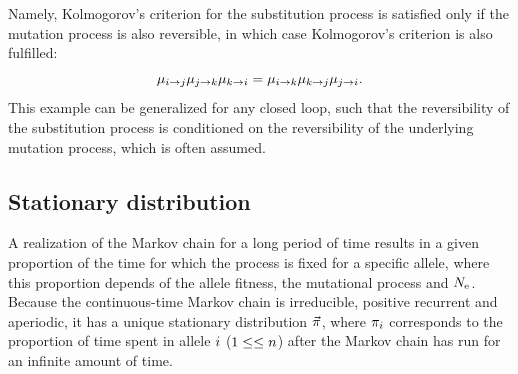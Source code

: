 Namely, Kolmogorov's criterion for the \gls{substitution} process is satisfied only if the mutation process is also reversible, in which case Kolmogorov's criterion is also fulfilled:
\begin{equation}
    \mu_{{i} \to {j}}\mu_{{j} \to {k}}\mu_{{k} \to {i}}=\mu_{{i} \to {k}}\mu_{{k} \to {j}}\mu_{{j} \to {i}}.
\end{equation}
This example can be generalized for any closed loop, such that the reversibility of the \gls{substitution} process is conditioned on the reversibility of the underlying mutation process, which is often assumed.

\subsection{Stationary distribution}

A realization of the \gls{Markov chain} for a long period of time results in a given proportion of the time for which the process is fixed for a specific \gls{allele}, where this proportion depends of the \gls{allele} fitness, the mutational process and $N_{\text{e}}$.
Because the continuous-time \gls{Markov chain} is irreducible, positive recurrent and aperiodic, it has a unique stationary distribution $\vec{\pi}$, where $\pi_{{i}}$ corresponds to the proportion of time spent in \gls{allele} ${i}$ ($1 \leq \leq n$) after the \gls{Markov chain} has run for an infinite amount of time.

